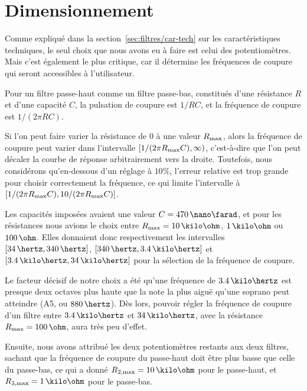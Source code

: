 \section{Dimensionnement}
\label{sec:filtres/dimens}

Comme expliqué dans la section~\ref{sec:filtres/car-tech}
sur les caractéristiques techniques,
le seul choix que nous avons eu à faire est celui des potentiomètres.
Mais c'est également le plus critique, car
il détermine les fréquences de coupure qui seront accessibles à l'utilisateur.

Pour un filtre passe-haut comme un filtre passe-bas,
constitués d'une résistance $R$ et d'une capacité $C$,
la pulsation de coupure est $1/RC$,
et la fréquence de coupure est $1/(2\pi RC)$.

Si l'on peut faire varier la résistance de $0$ à une valeur $R_{\mathrm{max}}$,
alors la fréquence de coupure peut varier dans l'intervalle
$[1/(2\pi R_{\mathrm{max}}C),\infty)$,
c'est-à-dire que l'on peut décaler la courbe
de réponse arbitrairement vers la droite.
Toutefois, nous considérons qu'en-dessous d'un réglage à $10\%$,
l'erreur relative est trop grande pour choisir correctement la fréquence,
ce qui limite l'intervalle à $[1/(2\pi R_{\mathrm{max}}C),10/(2\pi R_{\mathrm{max}}C)]$.

Les capacités imposées avaient une valeur $C=470\,\nano\farad$,
et pour les résistances nous avions le choix entre
$R\ind{max}=10\,\kilo\ohm$, $1\,\kilo\ohm$ ou $100\,\ohm$.
Elles donnaient donc respectivement les intervalles
$[34\,\hertz,340\,\hertz]$, $[340\,\hertz,3.4\,\kilo\hertz]$
et $[3.4\,\kilo\hertz,34\,\kilo\hertz]$
pour la sélection de la fréquence de coupure.

Le facteur décisif de notre choix a été
qu'une fréquence de $3.4\,\kilo\hertz$ est
presque deux octaves plus haute que la note la plus aiguë
qu'une soprano peut atteindre (A5, ou $880\,\hertz$).%
\cite{vocal-ranges}
Dès lors, pouvoir régler la fréquence de coupure d'un filtre
entre $3.4\,\kilo\hertz$ et $34\,\kilo\hertz$,
avec la résistance $R\ind{max} = 100\,\ohm$, aura très peu d'effet.

Ensuite, nous avons attribué les deux potentiomètres restants
aux deux filtres, sachant que la fréquence de coupure du passe-haut
doit être plus basse que celle du passe-bas,
ce qui a donné $R\ind{2,max}=10\,\kilo\ohm$ pour le passe-haut,
et $R\ind{3,max}=1\,\kilo\ohm$ pour le passe-bas.
